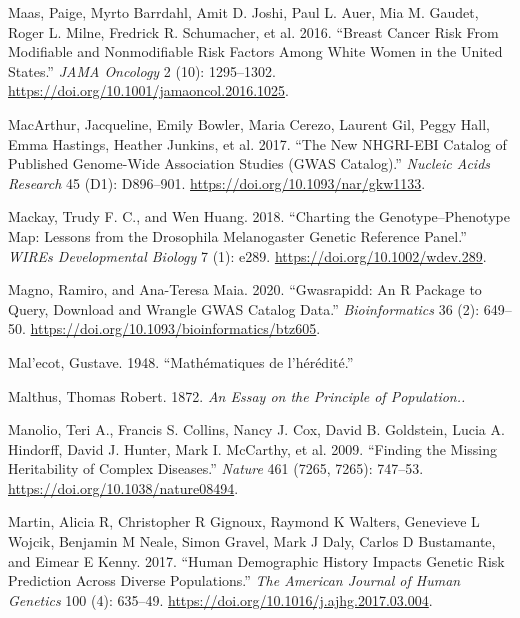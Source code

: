 \documentclass[
]{book}
\newlength{\cslhangindent}
\newlength{\cslentryspacingunit} %
\newenvironment{CSLReferences}[2] %
 {%
  \setlength{\parindent}{0pt}
  \ifodd #1
  \let\oldpar\par
  \def\par{\hangindent=\cslhangindent\oldpar}
  \fi
  \setlength{\parskip}{#2\cslentryspacingunit}
 }%
 {}
\begin{document}
\begin{CSLReferences}{1}{0}
\leavevmode{}%
Maas, Paige, Myrto Barrdahl, Amit D. Joshi, Paul L. Auer, Mia M. Gaudet, Roger L. Milne, Fredrick R. Schumacher, et al. 2016. {``Breast {Cancer Risk From Modifiable} and {Nonmodifiable Risk Factors Among White Women} in the {United States}.''} \emph{JAMA Oncology} 2 (10): 1295--1302. \url{https://doi.org/10.1001/jamaoncol.2016.1025}.

\leavevmode{}%
MacArthur, Jacqueline, Emily Bowler, Maria Cerezo, Laurent Gil, Peggy Hall, Emma Hastings, Heather Junkins, et al. 2017. {``The New {NHGRI-EBI Catalog} of Published Genome-Wide Association Studies ({GWAS Catalog}).''} \emph{Nucleic Acids Research} 45 (D1): D896--901. \url{https://doi.org/10.1093/nar/gkw1133}.

\leavevmode{}%
Mackay, Trudy F. C., and Wen Huang. 2018. {``Charting the Genotype--Phenotype Map: Lessons from the {Drosophila} Melanogaster {Genetic Reference Panel}.''} \emph{WIREs Developmental Biology} 7 (1): e289. \url{https://doi.org/10.1002/wdev.289}.

\leavevmode{}%
Magno, Ramiro, and Ana-Teresa Maia. 2020. {``Gwasrapidd: An {R} Package to Query, Download and Wrangle {GWAS} Catalog Data.''} \emph{Bioinformatics} 36 (2): 649--50. \url{https://doi.org/10.1093/bioinformatics/btz605}.

\leavevmode{}%
Mal'ecot, Gustave. 1948. {``Mathématiques de l'hérédité.''}

\leavevmode{}%
Malthus, Thomas Robert. 1872. \emph{An {Essay} on the {Principle} of {Population}..}

\leavevmode{}%
Manolio, Teri A., Francis S. Collins, Nancy J. Cox, David B. Goldstein, Lucia A. Hindorff, David J. Hunter, Mark I. McCarthy, et al. 2009. {``Finding the Missing Heritability of Complex Diseases.''} \emph{Nature} 461 (7265, 7265): 747--53. \url{https://doi.org/10.1038/nature08494}.

\leavevmode{}%
Martin, Alicia R, Christopher R Gignoux, Raymond K Walters, Genevieve L Wojcik, Benjamin M Neale, Simon Gravel, Mark J Daly, Carlos D Bustamante, and Eimear E Kenny. 2017. {``Human Demographic History Impacts Genetic Risk Prediction Across Diverse Populations.''} \emph{The American Journal of Human Genetics} 100 (4): 635--49. \url{https://doi.org/10.1016/j.ajhg.2017.03.004}.


\end{CSLReferences}
\end{document}
